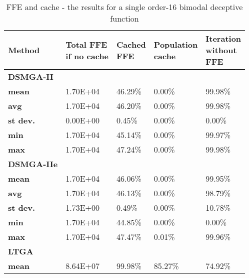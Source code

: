 \begin{table}[]
	\centering
	\caption{FFE and cache - the results for a single order-16 bimodal deceptive function}
	\label{tab:ImmediateStuckDec3}
	\begin{tabular}{lllll}
		\toprule
		\textbf{Method} & \pbox{20cm}{\textbf{Total FFE}\\\textbf{if no cache}} & \pbox{20cm}{\textbf{Cached}\\\textbf{FFE}} & \pbox{20cm}{\textbf{Population}\\\textbf{cache}} & \pbox{20cm}{\textbf{Iteration}\\\textbf{without}\\\textbf{FFE}}  \\ 
		
		\midrule
		\textbf{DSMGA-II} & & & & \\ 
		\textbf{mean}                  & 1.70E+04      & 46.29\%      & 0.00\%                          & 99.98\% \\
		\textbf{avg}                   & 1.70E+04      & 46.20\%      & 0.00\%                          & 99.98\% \\
		\textbf{st dev.}               & 0.00E+00      & 0.45\%       & 0.00\%                          & 0.00\%  \\
		\textbf{min}                   & 1.70E+04      & 45.14\%      & 0.00\%                          & 99.97\% \\
		\textbf{max}                   & 1.70E+04      & 47.24\%      & 0.00\%                          & 99.98\% \\
		\midrule
		\textbf{DSMGA-IIe} & & & & \\
		\textbf{mean}                  & 1.70E+04      & 46.06\%      & 0.00\%                          & 99.95\% \\
		\textbf{avg}                   & 1.70E+04      & 46.13\%      & 0.00\%                          & 98.79\% \\
		\textbf{st dev.}               & 1.73E+00      & 0.49\%       & 0.00\%                          & 10.78\% \\
		\textbf{min}                   & 1.70E+04      & 44.85\%      & 0.00\%                          & 0.00\%  \\
		\textbf{max}                   & 1.70E+04      & 47.47\%      & 0.01\%                          & 99.96\% \\
		\midrule
		\textbf{LTGA} & & & & \\
		\textbf{mean}                  & 8.64E+07      & 99.98\%      & 85.27\%                         & 74.92\% \\

\end{tabular}
\end{table}

